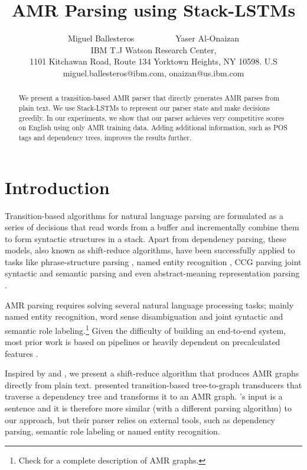 \documentclass[11pt,a4paper]{article}
\title{AMR Parsing using Stack-LSTMs}
\author{Miguel Ballesteros~~~~~~~~~~Yaser Al-Onaizan\\
IBM T.J Watson Research Center, \\ 1101 Kitchawan Road, Route 134
Yorktown Heights, NY 10598. U.S \\
{ \sf miguel.ballesteros@ibm.com, onaizan@us.ibm.com } }
\date{}
\begin{document}
\maketitle
\begin{abstract}
We present a transition-based AMR parser that directly generates AMR parses from plain text. 
  We use Stack-LSTMs to represent 
  our parser state and make decisions greedily. In our experiments, we show that our parser achieves 
  very competitive scores on English using only AMR training data. Adding additional 
information, such as POS tags and dependency trees, improves the results further.
\end{abstract}

\section{Introduction}

Transition-based algorithms for natural language parsing \cite{yamada03,nivre03iwpt,arcstd,nivre08cl}
are formulated as a series of decisions that read words from a buffer and incrementally combine 
them to form syntactic structures in a stack. Apart from dependency parsing, these models, also known as 
shift-reduce algorithms, have been successfully applied to tasks like phrase-structure parsing 
\cite{ZhangC11,cdyer2016},  named entity recognition \cite{lample2016},  CCG parsing \cite{misra-artzi:2016:EMNLP2016}
joint syntactic and 
semantic parsing \cite{henderson2013,SwayamdiptaBDS16} and 
even abstract-meaning representation parsing \cite{wangxuepradhan,WangXP15,DamonteCS16}.

AMR parsing requires solving several natural language processing tasks; mainly named entity 
recognition, word sense disambiguation and 
joint syntactic and semantic role  labeling.\footnote{Check \cite{banarescu} for a complete description of 
AMR graphs.} Given the difficulty of building an end-to-end system, most prior work  is based on 
pipelines  or heavily dependent on precalculated features \cite[inter-alia]{jamr,zhouemnlp,stanfordamr,wangxuepradhan}.

Inspired by  and , we 
present a shift-reduce algorithm that produces AMR graphs directly from plain text. 
 presented 
transition-based tree-to-graph transducers that traverse a dependency tree and 
transforms it to an AMR graph. 's input is a sentence and it is therefore more similar 
(with a different parsing algorithm) to our approach, but their parser relies on 
external tools, such as dependency parsing, semantic role labeling or named entity recognition.
\end{document}
